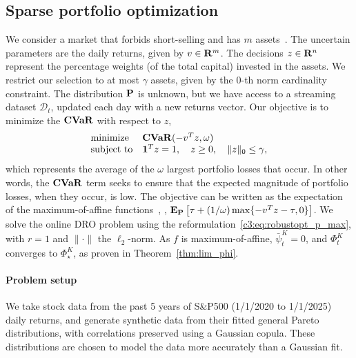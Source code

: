 
\subsection{Sparse portfolio optimization}
\label{c3:sub:sparse_portfolio_optimization}
We consider a market that forbids short-selling and has $m$ assets~\cite{mro,kuhn2019wasserstein}.
The uncertain parameters are the daily returns, given by $v \in {\mathbf R}^m$.
The decisions ${z\in {\mathbf R}^n}$ represent the percentage weights (of the total capital) invested in the assets.
We restrict our selection to at most $\gamma$ assets, given by the $0$-th norm cardinality constraint.
The distribution ${\mathbf P}$ is unknown, but we have access to a streaming dataset $\mathcal{D}_t$, updated each day with a new returns vector. 
Our objective is to minimize the $\mathop{\bf CVaR}$ with respect to $z$,
\begin{equation*}
	\label{c3:eq:portfolio}
	\begin{array}{ll}
	\text{minimize  } &\mathop{\bf CVaR}(- v^Tz,\omega)\\
	\text{subject to} & \mathbf 1^T z = 1, \quad z \ge 0, \quad \|z\|_0 \leq \gamma,
	\end{array}
\end{equation*}
which represents the average of the $\omega$ largest portfolio losses that occur. In other words, the $\mathop{\bf CVaR}$ term seeks to ensure that the expected magnitude of portfolio losses, when they occur, is low.
The objective can be written as the expectation of the maximum-of-affine functions~\cite{cvaropt}, \ie, $\mathbf{E}_{{\mathbf P}}\left[\tau +(1/\omega) \max\{-v^Tz -\tau, 0\}\right]$. 
We solve the online \gls{DRO} problem using the reformulation~\eqref{c3:eq:robustopt_p_max}, with $r=1$ and $\|\cdot\|$ the $\ell_2$-norm. 
As $f$ is maximum-of-affine, $\bar{\psi}_t^K=0$, and $\Phi^K_t$ converges to $\Phi^K_\star$, as proven in Theorem~\ref{thm:lim_phi}.

\paragraph{Problem setup}
We take stock data from the past 5 years of S\&P500 (1/1/2020 to 1/1/2025) daily returns, and generate synthetic data from their fitted general Pareto distributions, with correlations preserved using a Gaussian copula. 
These distributions are chosen to model the data more accurately than a Gaussian fit.

